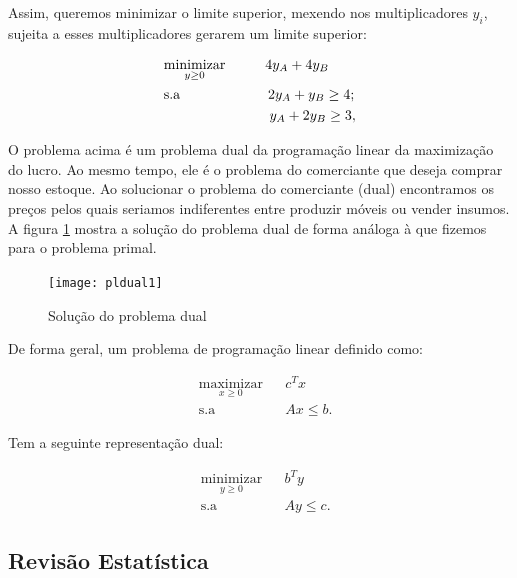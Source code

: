 Assim, queremos minimizar o limite superior, mexendo nos multiplicadores
$y_{i}$, sujeita a esses multiplicadores gerarem um limite superior:

\begin{align}
    & \underset{y\geq0}{\text{minimizar}} \hspace{1cm} 4y_A+4y_B \label{eq1} \\
    & \text{s.a}  \hspace{2.2cm} 2y_A+y_B \geq 4; \label{eq2} \\
    &             \hspace{2.65cm} y_A+2y_B\geq 3, \label{eq3}
\end{align}

O problema acima é um problema dual da programação linear da maximização do lucro. Ao mesmo tempo, ele é o problema do comerciante que deseja comprar nosso estoque. Ao solucionar o problema do comerciante (dual) encontramos os preços pelos quais seriamos indiferentes entre produzir móveis ou vender insumos. A figura \ref{pldual1} mostra a solução do problema dual de forma análoga à que fizemos para o problema primal. 

\begin{figure}[H]
\begin{centering}
\texttt{[image: pldual1]}\protect\caption{\label{pldual1}Solução do problema dual}
\end{centering}
\end{figure}


De forma geral, um problema de programação linear definido como: 

\begin{equation*}
\begin{aligned}
& \underset{x\geq0}{\text{maximizar}}
& & c^{T}x \\
& \text{s.a}
& & Ax \leq b.
\end{aligned}
\end{equation*}

Tem a seguinte representação dual:

\begin{equation*}
\begin{aligned}
& \underset{y\geq0}{\text{minimizar}}
& & b^{T}y \\
& \text{s.a}
& & Ay \leq c.
\end{aligned}
\end{equation*}


\subsection{Revisão Estatística}

